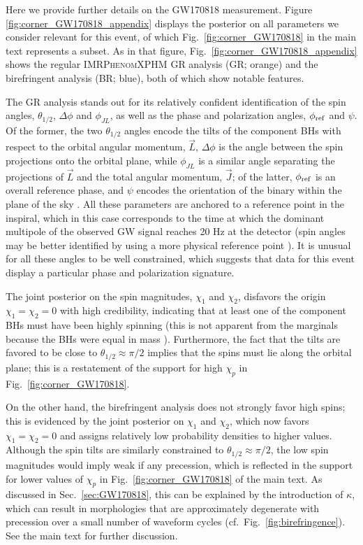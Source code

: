 \documentclass[aps,prd,twocolumn,superscriptaddress,preprintnumbers,floatfix,nofootinbib]{revtex4-2}
\begin{document}
Here we provide further details on the GW170818 measurement. 
Figure \ref{fig:corner_GW170818_appendix} displays the posterior on all parameters we consider relevant for this event, of which Fig.~\ref{fig:corner_GW170818} in the main text represents a subset.
As in that figure, Fig.~\ref{fig:corner_GW170818_appendix} shows the regular \textsc{IMRPhenomXPHM} \ac{GR} analysis (GR; orange) and the birefringent analysis (BR; blue), both of which show notable features.

The GR analysis stands out for its relatively confident identification of the spin angles, $\theta_{1/2}$, $\Delta \phi$ and $\phi_{JL}$, as well as the phase and polarization angles, $\phi_{\rm ref}$ and $\psi$.
Of the former, the two $\theta_{1/2}$ angles encode the tilts of the component \acp{BH} with respect to the orbital angular momentum, $\vec{L}$, $\Delta \phi$ is the angle between the spin projections onto the orbital plane, while $\phi_{JL}$ is a similar angle separating the projections of $\vec{L}$ and the total angular momentum, $\vec{J}$;
of the latter, $\phi_{\rm ref}$ is an overall reference phase, and $\psi$ encodes the orientation of the binary within the plane of the sky \cite{Isi:2022mbx}.
All these parameters are anchored to a reference point in the inspiral, which in this case corresponds to the time at which the dominant multipole of the observed \ac{GW} signal reaches 20 Hz at the detector (spin angles may be better identified by using a more physical reference point \cite{Varma:2021csh}).
It is unusual for all these angles to be well constrained, which suggests that data for this event display a particular phase and polarization signature.

The joint posterior on the spin magnitudes, $\chi_1$ and $\chi_2$, disfavors the origin $\chi_1 = \chi_2 = 0$ with high credibility, indicating that at least one of the component \acp{BH} must have been highly spinning (this is not apparent from the marginals because the \acp{BH} were equal in mass \cite{Biscoveanu:2020are}).
Furthermore, the fact that the tilts are favored to be close to $\theta_{1/2} \approx \pi/2$ implies that the spins must lie along the orbital plane;
this is a restatement of the support for high $\chi_p$ in Fig.~\ref{fig:corner_GW170818}.

On the other hand, the birefringent analysis does not strongly favor high spins; this is evidenced by the joint posterior on $\chi_1$ and $\chi_2$, which now favors $\chi_1 = \chi_2 = 0$ and assigns relatively low probability densities to higher values.
Although the spin tilts are similarly constrained to $\theta_{1/2} \approx \pi/2$, the low spin magnitudes would imply weak if any precession, which is reflected in the support for lower values of $\chi_p$ in Fig.~\ref{fig:corner_GW170818} of the main text.
As discussed in Sec.~\ref{sec:GW170818}, this can be explained by the introduction of $\kappa$, which can result in morphologies that are approximately degenerate with precession over a small number of waveform cycles (cf.~Fig.~\ref{fig:birefringence}).
See the main text for further discussion.
\end{document}
